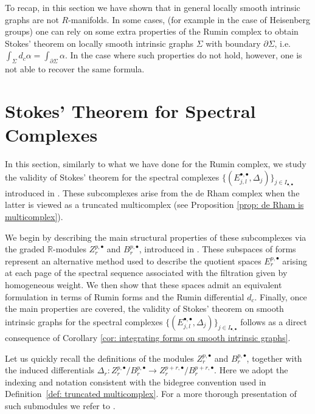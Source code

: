 \documentclass[dvipsnames]{amsart}
\theoremstyle{definition}
\theoremstyle{definition}
\numberwithin{equation}{section}
\newcommand{\R}{\mathbb{R}}
\begin{document}
To recap, in this section we have shown that in general locally smooth intrinsic graphs are not $R$-manifolds. In some cases, (for example in the case of Heisenberg groups) one can rely on some extra properties of the Rumin complex  to obtain Stokes' theorem on locally smooth intrinsic graphs $\Sigma$ with boundary $\partial\Sigma$, i.e. $\int_\Sigma d_c\alpha=\int_{\partial\Sigma}\alpha$. In the case where such properties do not hold, however, one is not able to recover the same formula. 




\section{Stokes' Theorem for Spectral Complexes}

In this section, similarly to what we have done for the Rumin complex, we study the validity of Stokes' theorem for the spectral complexes $\{(E_{j,l}^{\bullet,\bullet},\Delta_j)\}_{j\in I_{\bullet,\bullet}}$ introduced in \cite{tripaldi2026spectralcomplexestruncatedmulticomplexes}. These subcomplexes arise from the de Rham complex when the latter is viewed as a truncated multicomplex (see Proposition \ref{prop: de Rham is multicomplex}). 

We begin by describing the main structural properties of these subcomplexes via the graded $\R$-modules $Z_r^{p,\bullet}$ and $B_r^{p,\bullet}$, introduced in \cite{livernet2020spectral}. These subspaces of forms represent an alternative method used to describe the quotient spaces $E_r^{p,\bullet}$ arising at each page of the spectral sequence associated with the filtration given by homogeneous weight. We then show that these spaces admit an equivalent formulation in terms of Rumin forms and the Rumin differential $d_c$.
Finally, once the main properties are covered, the validity of Stokes' theorem on smooth intrinsic graphs for the spectral complexes $\{(E_{j,l}^{\bullet,\bullet},\Delta_j)\}_{j\in I_{\bullet,\bullet}}$ follows as a direct consequence of Corollary \ref{cor: integrating forms on smooth intrinsic graphs}.

Let us quickly recall the definitions of the modules $Z_r^{p,\bullet}$ and $B_r^{p,\bullet}$, together with the induced differentials $\Delta_r\colon Z_r^{p,\bullet}/B_r^{p,\bullet}\to Z_r^{p+r,\bullet}/B_r^{p+r,\bullet}$. Here we adopt the indexing and notation consistent with the bidegree convention used in Definition~\ref{def: truncated multicomplex}. For a more thorough presentation of such submodules we refer to \cite{tripaldi2026spectralcomplexestruncatedmulticomplexes}.
\end{document}
